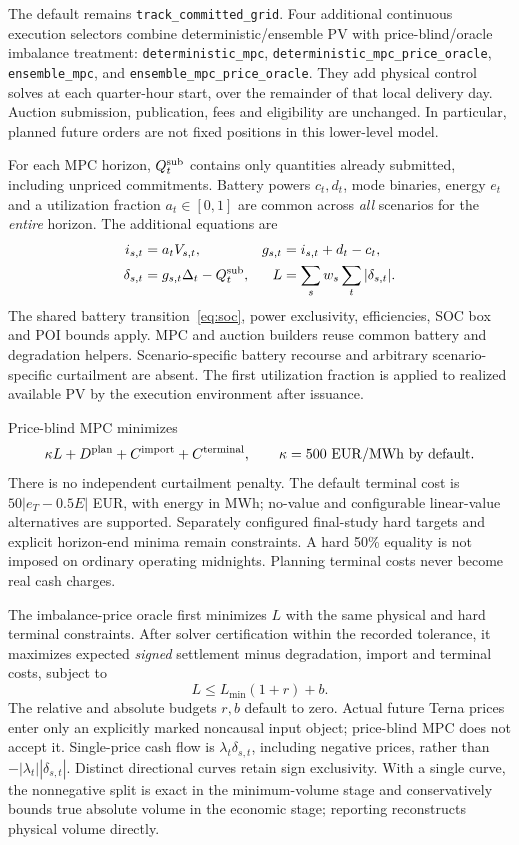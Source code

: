 \documentclass[11pt,a4paper]{article}
\begin{document}
The default remains \texttt{track\_committed\_grid}. Four additional continuous
execution selectors combine deterministic/ensemble PV with price-blind/oracle
imbalance treatment: \texttt{deterministic\_mpc},
\texttt{deterministic\_mpc\_price\_oracle}, \texttt{ensemble\_mpc}, and
\texttt{ensemble\_mpc\_price\_oracle}. They add physical control solves at each
quarter-hour start, over the remainder of that local delivery day. Auction
submission, publication, fees and eligibility are unchanged. In particular,
planned future orders are not fixed positions in this lower-level model.

For each MPC horizon, $Q_t^{\rm sub}$ contains only quantities already submitted,
including unpriced commitments. Battery powers $c_t,d_t$, mode binaries, energy
$e_t$ and a utilization fraction $a_t\in[0,1]$ are common across \emph{all}
scenarios for the \emph{entire} horizon. The additional equations are
\begin{align}
 i_{s,t}&=a_t V_{s,t}, &
 g_{s,t}&=i_{s,t}+d_t-c_t,\\
 \delta_{s,t}&=g_{s,t}\Delta_t-Q_t^{\rm sub}, &
 L&=\sum_s w_s\sum_t |\delta_{s,t}|.
\end{align}
The shared battery transition~\eqref{eq:soc}, power exclusivity, efficiencies,
SOC box and POI bounds apply. MPC and auction builders reuse common battery and
degradation helpers. Scenario-specific battery recourse and arbitrary
scenario-specific curtailment are absent. The first utilization fraction is
applied to realized available PV by the execution environment after issuance.

Price-blind MPC minimizes
\begin{equation}
 \kappa L+D^{\rm plan}+C^{\rm import}+C^{\rm terminal},\qquad
 \kappa=500\ \mathrm{EUR/MWh}\ \text{by default}.
\end{equation}
There is no independent curtailment penalty. The default terminal cost is
$50|e_T-0.5E|$ EUR, with energy in MWh; no-value and configurable linear-value
alternatives are supported. Separately configured final-study hard targets and
explicit horizon-end minima remain constraints. A hard 50\% equality is not
imposed on ordinary operating midnights. Planning terminal costs never become
real cash charges.

The imbalance-price oracle first minimizes $L$ with the same physical and hard
terminal constraints. After solver certification within the recorded tolerance,
it maximizes expected \emph{signed} settlement minus degradation, import and
terminal costs, subject to
\begin{equation}
 L\le L_{\min}(1+r)+b.
\end{equation}
The relative and absolute budgets $r,b$ default to zero. Actual future Terna
prices enter only an explicitly marked noncausal input object; price-blind MPC
does not accept it. Single-price cash flow is $\lambda_t\delta_{s,t}$, including
negative prices, rather than $-|\lambda_t||\delta_{s,t}|$. Distinct directional
curves retain sign exclusivity. With a single curve, the nonnegative split is
exact in the minimum-volume stage and conservatively bounds true absolute
volume in the economic stage; reporting reconstructs physical volume directly.
\end{document}
